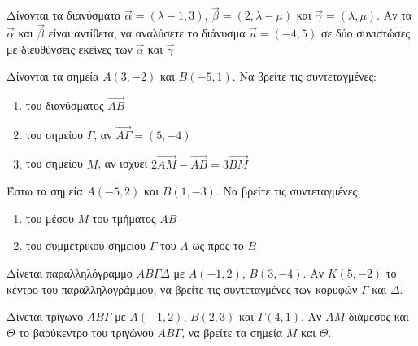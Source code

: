 \documentclass{../../presentation}
\begin{document}
\begin{askisi}
  Δίνονται τα διανύσματα $\vec{α}=(λ-1,3)$, $\vec{β}=(2,λ-μ)$ και $\vec{γ}=(λ,μ)$. Αν τα $\vec{α}$ και $\vec{β}$ είναι αντίθετα, να αναλύσετε το διάνυσμα $\vec{u}=(-4,5)$ σε δύο συνιστώσες με διευθύνσεις εκείνες των $\vec{α}$ και $\vec{γ}$


\end{askisi}

\begin{askisi}
  Δίνονται τα σημεία $Α(3,-2)$ και $Β(-5,1)$. Να βρείτε τις συντεταγμένες:

  \begin{enumerate}
    \item<1-> του διανύσματος $\overrightarrow{ΑΒ}$
    \item<2-> του σημείου $Γ$, αν $\overrightarrow{ΑΓ}=(5,-4)$
    \item<3-> του σημείου $Μ$, αν ισχύει $2\overrightarrow{ΑΜ}-\overrightarrow{ΑΒ}=3\overrightarrow{ΒΜ}$
  \end{enumerate}


\end{askisi}

\begin{askisi}
  Έστω τα σημεία $Α(-5,2)$ και $Β(1,-3)$. Να βρείτε τις συντεταγμένες:
  \begin{enumerate}
    \item<1-> του μέσου $Μ$ του τμήματος $ΑΒ$
    \item<2-> του συμμετρικού σημείου $Γ$ του $Α$ ως προς το $Β$
  \end{enumerate}


\end{askisi}

\begin{askisi}

  Δίνεται παραλληλόγραμμο $ΑΒΓΔ$ με $Α(-1,2)$, $Β(3,-4)$. Αν $Κ(5,-2)$ το κέντρο του παραλληλογράμμου, να βρείτε τις συντεταγμένες των κορυφών $Γ$ και $Δ$.


\end{askisi}

\begin{askisi}
  Δίνεται τρίγωνο $ΑΒΓ$ με $Α(-1,2)$, $Β(2,3)$ και $Γ(4,1)$. Αν $ΑΜ$ διάμεσος και $Θ$ το βαρύκεντρο του τριγώνου $ΑΒΓ$, να βρείτε τα σημεία $Μ$ και $Θ$.

\end{askisi}
\end{document}
